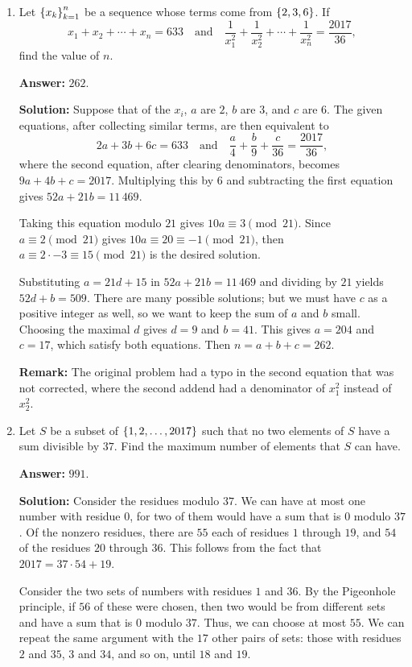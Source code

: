 \documentclass[11pt,paper=letter]{scrartcl}
\begin{document}
\begin{enumerate}[left=0pt]
\item Let $\left\{ x_k \right\}^n_{k=1}$ be a sequence whose terms come from $\left\{ 2, 3, 6 \right\}$. If $$x_1 + x_2 + \cdots + x_n = 633\quad\text{and}\quad\frac1{x_1^2} + \frac1{x_2^2} + \cdots + \frac1{x_n^2} = \frac{2017}{36},$$ find the value of $n$.

\textbf{Answer:} $\boxed{262}$.

\textbf{Solution:} Suppose that of the $x_i$, $a$ are $2$, $b$ are $3$, and $c$ are $6$. The given equations, after collecting similar terms, are then equivalent to $$2a + 3b + 6c = 633\quad\text{and}\quad\dfrac a4 + \dfrac b9 + \dfrac c{36} = \frac{2017}{36},$$ where the second equation, after clearing denominators, becomes $9a + 4b + c = 2017$. Multiplying this by $6$ and subtracting the first equation gives $52a + 21b = 11\,469$.

Taking this equation modulo $21$ gives $10a \equiv 3 \pmod{21}$. Since $a \equiv 2 \pmod{21}$ gives $10a \equiv 20 \equiv -1 \pmod{21}$, then $a \equiv 2 \cdot -3 \equiv 15 \pmod{21}$ is the desired solution.

Substituting $a = 21d + 15$ in $52a + 21b = 11\,469$ and dividing by $21$ yields $52d + b = 509$. There are many possible solutions; but we must have $c$ as a positive integer as well, so we want to keep the sum of $a$ and $b$ small. Choosing the maximal $d$ gives $d = 9$ and $b = 41$. This gives $a = 204$ and $c = 17$, which satisfy both equations. Then $n = a + b + c = 262$.

\textbf{Remark:} The original problem had a typo in the second equation that was not corrected, where the second addend had a denominator of $x_1^2$ instead of $x_2^2$.

\item Let $S$ be a subset of $\left\{ 1, 2, \ldots, 2017 \right\}$ such that no two elements of $S$ have a sum divisible by $37$. Find the maximum number of elements that $S$ can have.

\textbf{Answer:} $\boxed{991}$.

\textbf{Solution:} Consider the residues modulo $37$. We can have at most one number with residue $0$, for two of them would have a sum that is $0$ modulo $37$. Of the nonzero residues, there are $55$ each of residues $1$ through $19$, and $54$ of the residues $20$ through $36$. This follows from the fact that $2017 = 37 \cdot 54 + 19$. 

Consider the two sets of numbers with residues $1$ and $36$. By the Pigeonhole principle, if $56$ of these were chosen, then two would be from different sets and have a sum that is $0$ modulo $37$. Thus, we can choose at most $55$. We can repeat the same argument with the $17$ other pairs of sets: those with residues $2$ and $35$, $3$ and $34$, and so on, until $18$ and $19$.


\end{enumerate}
\end{document}
